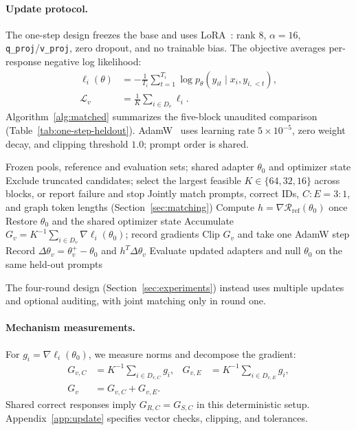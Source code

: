 \paragraph{Update protocol.}
The one-step design freezes the base and uses LoRA~\citep{hu2021lora}:
rank $8$, $\alpha=16$, \texttt{q\_proj}/\texttt{v\_proj}, zero dropout,
and no trainable bias.
The objective averages per-response negative log likelihood:
\begin{equation}
 \begin{aligned}
 \ell_i(\theta)&=-\frac{1}{T_i}\sum_{t=1}^{T_i}
 \log p_\theta(y_{it}\mid x_i,y_{i,<t}),\\
 \mathcal L_v&=\frac{1}{K}\sum_{i\in D_v}\ell_i.
 \end{aligned}
 \label{eq:response-loss}
\end{equation}
Algorithm~\ref{alg:matched} summarizes the five-block unaudited comparison
(Table~\ref{tab:one-step-heldout}). AdamW~\citep{loshchilov2019adamw} uses learning rate $5\times10^{-5}$, zero
weight decay, and clipping threshold $1.0$; prompt order is shared.

\begin{algorithm}[H]
\caption{Unaudited one-step comparison under matched selection}
\label{alg:matched}
\begin{algorithmic}[1]
\Require Frozen pools, reference and evaluation sets; shared adapter $\theta_0$ and optimizer state
\State Exclude truncated candidates; select the largest feasible $K\in\{64,32,16\}$ across blocks, or report failure and stop
\State Jointly match prompts, correct IDs, $C:E=3:1$, and graph token lengths (Section~\ref{sec:matching})
\State Compute $h=\nabla\mathcal R_{\mathrm{ref}}(\theta_0)$ once
    \State Restore $\theta_0$ and the shared optimizer state
    \State Accumulate $G_v=K^{-1}\sum_{i\in D_v}\nabla\ell_i(\theta_0)$; record gradients
    \State Clip $G_v$ and take one AdamW step
    \State Record $\Delta\theta_v=\theta_v^+-\theta_0$ and $h^T\Delta\theta_v$
\EndFor
\State Evaluate updated adapters and null $\theta_0$ on the same held-out prompts
\end{algorithmic}
\end{algorithm}

The four-round design (Section~\ref{sec:experiments}) instead uses multiple
updates and optional auditing, with joint matching only in round one.

\paragraph{Mechanism measurements.}
For $g_i=\nabla\ell_i(\theta_0)$, we measure norms and decompose the gradient:
\begin{equation}
 \begin{aligned}
 G_{v,C}&=K^{-1}\sum_{i\in D_{v,C}}g_i,&
 G_{v,E}&=K^{-1}\sum_{i\in D_{v,E}}g_i,\\
 G_v&=G_{v,C}+G_{v,E}.
 \end{aligned}
 \label{eq:gradient-split}
\end{equation}
Shared correct responses imply $G_{R,C}=G_{S,C}$ in this deterministic setup.
Appendix~\ref{app:update} specifies vector checks, clipping, and tolerances.

